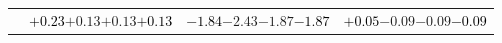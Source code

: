 \documentclass[compress]{beamer}
\begin{document}
\begin{frame}
\begin{tabular}{r | c | c | c}
          & \textcolor{black}{$+0.23$}\hspace{0.1 cm}$+0.13$\hspace{0.1 cm}$+0.13$\hspace{0.1 cm}\textcolor{black}{$+0.13$} & \textcolor{black}{$-1.84$}\hspace{0.1 cm}$-2.43$\hspace{0.1 cm}$-1.87$\hspace{0.1 cm}\textcolor{black}{$-1.87$} & \textcolor{black}{$+0.05$}\hspace{0.1 cm}$-0.09$\hspace{0.1 cm}$-0.09$\hspace{0.1 cm}\textcolor{black}{$-0.09$} \\
\end{tabular}
\end{frame}
\end{document}
